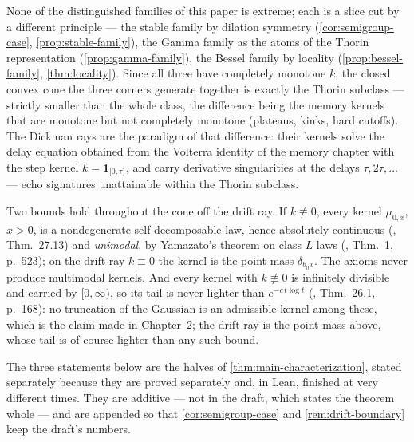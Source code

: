 \begin{remark}\label{rem:extreme-rays}
None of the distinguished families of this paper is extreme; each is a slice cut by a different
principle --- the stable family by dilation symmetry (\ref{cor:semigroup-case},
\ref{prop:stable-family}), the Gamma family as the atoms of the Thorin representation
(\ref{prop:gamma-family}), the Bessel family by locality (\ref{prop:bessel-family},
\ref{thm:locality}). Since all
three have completely monotone $k$, the closed convex cone the three corners generate together
is exactly the Thorin subclass --- strictly smaller than the whole class, the difference being
the memory kernels that are monotone but not completely monotone (plateaus, kinks, hard cutoffs). The
Dickman rays are the paradigm of that difference: their kernels solve the delay equation
obtained from the Volterra identity of the memory chapter with the step kernel
$k = \mathbf{1}_{[0,\tau)}$, and carry derivative singularities at the delays
$\tau, 2\tau, \dots$ --- echo signatures unattainable within the Thorin subclass.

Two bounds hold throughout the cone off the drift ray. If $k \not\equiv 0$, every kernel
$\mu_{0,x}$, $x > 0$, is a nondegenerate self-decomposable law, hence absolutely continuous
(, Thm.~27.13) and \emph{unimodal}, by Yamazato's theorem on class $L$
laws (, Thm.~1, p.~523); on the drift ray $k \equiv 0$ the
kernel is the point mass $\delta_{b_0 x}$. The axioms never produce multimodal kernels. And
every kernel with $k \not\equiv 0$ is infinitely divisible and carried by $[0,\infty)$, so its
tail is never lighter than $e^{-c\,t\log t}$ (, Thm.~26.1, p.~168): no
truncation of the Gaussian is an admissible kernel among these, which is the claim made in
Chapter~2; the drift ray is the point mass above, whose tail is of course lighter than any
such bound.
\end{remark}

\bigskip

The three statements below are the halves of \ref{thm:main-characterization}, stated separately
because they are proved separately and, in Lean, finished at very different times. They are
additive --- not in the draft, which states the theorem whole --- and are appended so that
\ref{cor:semigroup-case} and \ref{rem:drift-boundary} keep the draft's numbers.

